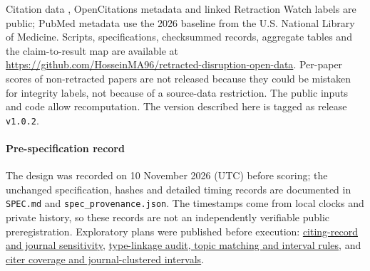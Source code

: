 Citation data \citep{arjomandi2024dataset}, OpenCitations metadata \citep{ocmeta2024dump} and linked Retraction Watch
labels \citep{arjomandi2026retracteddata} are public; PubMed metadata use the 2026 baseline from the
U.S. National Library of Medicine.
Scripts, specifications, checksummed records, aggregate tables and the claim-to-result map are available at
\else
\url{https://github.com/HosseinMA96/retracted-disruption-open-data}\fi. Per-paper scores of non-retracted papers are
not released because they could be mistaken for integrity labels, not because of a source-data restriction.
The public inputs and code allow recomputation. The version described here is tagged as release \texttt{v1.0.2}.

\paragraph{Pre-specification record} The design was recorded on 10 November 2026 (UTC) before scoring;
the unchanged specification, hashes and detailed timing records are documented in
\texttt{SPEC.md} and \texttt{spec\_provenance.json}.
The timestamps come from local clocks and private history, so these records are not an independently
verifiable public preregistration.
Exploratory plans were published before execution:
\href{https://github.com/HosseinMA96/retracted-disruption-open-data/commit/9c4ba4ca9bca39542f86a014bda2db463c1534ac}{citing-record and journal sensitivity},
\href{https://github.com/HosseinMA96/retracted-disruption-open-data/commit/018d835f7db497a788320977d54d4b62f3755918}{type-linkage audit, topic matching and interval rules}, and
\href{https://github.com/HosseinMA96/retracted-disruption-open-data/commit/4169ea7cbd6a600f420c6871c566bdaa37b5b214}{citer coverage and journal-clustered intervals}.
